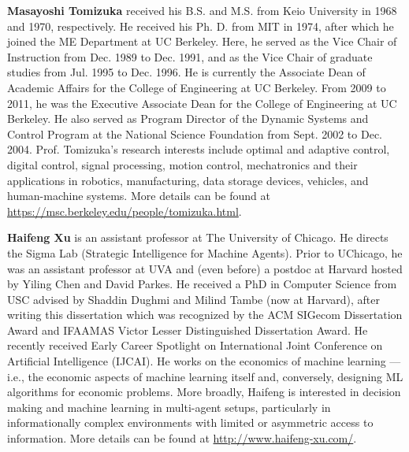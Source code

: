 \documentclass[10pt]{article} %
\begin{document}
\textbf{Masayoshi Tomizuka} received his B.S. and M.S. from Keio University in 1968 and 1970, respectively. He received his Ph. D. from MIT in 1974, after which he joined the ME Department at UC Berkeley. Here, he served as the Vice Chair of Instruction from Dec. 1989 to Dec. 1991, and as the Vice Chair of graduate studies from Jul. 1995 to Dec. 1996. He is currently the Associate Dean of Academic Affairs for the College of Engineering at UC Berkeley. From 2009 to 2011, he was the Executive Associate Dean for the College of Engineering at UC Berkeley. He also served as Program Director of the Dynamic Systems and Control Program at the National Science Foundation from Sept. 2002 to Dec. 2004. Prof. Tomizuka’s research interests include optimal and adaptive control, digital control, signal processing, motion control, mechatronics and their applications in robotics, manufacturing, data storage devices, vehicles, and human-machine systems. More details can be found at \href{https://msc.berkeley.edu/people/tomizuka.html}{https://msc.berkeley.edu/people/tomizuka.html}. 


\textbf{Haifeng Xu} is an assistant professor at The University of Chicago. He directs the Sigma Lab (Strategic Intelligence for Machine Agents). Prior to UChicago, he was an assistant professor at UVA and (even before) a postdoc at Harvard hosted by Yiling Chen and David Parkes. He received a PhD in Computer Science from USC advised by Shaddin Dughmi and Milind Tambe (now at Harvard), after writing this dissertation which was recognized by the ACM SIGecom Dissertation Award and IFAAMAS Victor Lesser Distinguished Dissertation Award. He recently received Early Career Spotlight on International Joint Conference on Artificial Intelligence (IJCAI). He works on the economics of machine learning — i.e., the economic aspects of machine learning itself and, conversely, designing ML algorithms for economic problems. More broadly, Haifeng is interested in decision making and machine learning in multi-agent setups, particularly in informationally complex environments with limited or asymmetric access to information. More details can be found at \href{http://www.haifeng-xu.com/}{http://www.haifeng-xu.com/}. 
\end{document}
